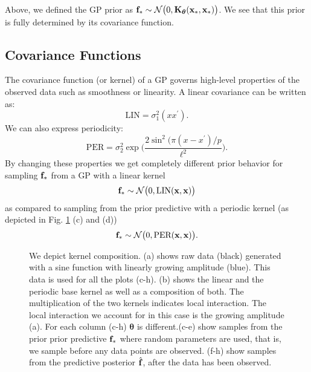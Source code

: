 Above, we defined the \ac{GP} prior as $\mathbf{f}_* \sim \mathcal{N}\big(0,\mathbf{K}_{\bm{\theta}}(\mathbf{x}_*,\mathbf{x}_*)\big)$.
We see that this prior is fully determined by its covariance function.
\subsection{Covariance Functions}
The covariance function (or kernel) of a \ac{GP} governs high-level properties of the observed data such as smoothness or linearity. A linear covariance can be written as:
\begin{equation}\label{eq:LIN1}
    \text{LIN} =   \sigma_1^2(x x^\prime).
\end{equation}
We can also express periodicity:
\begin{equation}\label{eq:PER1}
    \text{PER} =  \sigma_2^2 \exp \bigg( \frac{2 \sin^2 ( \pi (x - x^\prime)/p}{\ell^2} \bigg). 
\end{equation}
By changing these properties we get completely different prior behavior for sampling $\mathbf{f}_*$ from a
\ac{GP} with a linear kernel
\[
\mathbf{f}_* \sim \mathcal{N}\big(0,\text{LIN}(\mathbf{x},\mathbf{x})\big)
\]
as compared to sampling from the prior predictive with a periodic kernel (as depicted in 
Fig. \ref{fig:composition_tutorial} (c) and (d))
\[
\mathbf{f}_* \sim \mathcal{N}\big(0,\text{PER}(\mathbf{x},\mathbf{x})\big).
\]
\begin{figure}

\caption{We depict kernel composition. 
(a) shows raw data (black) generated with a sine function with linearly growing amplitude (blue).
This data is used for all the plots (c-h). 
(b) shows the linear and the periodic base kernel as well as a composition of both. 
The multiplication of the two kernels indicates local interaction. The local interaction we account for in this case is the growing amplitude (a). For each column (c-h) $\bm{\theta}$ is different.(c-e) show samples from the prior
prior predictive $\mathbf{f}_*$ where random parameters are used, that is, we sample before any data points are observed.
(f-h) show samples from the predictive posterior $\hat{\mathbf{f}}$, after the data has been observed.}
\label{fig:composition_tutorial}
\end{figure}
